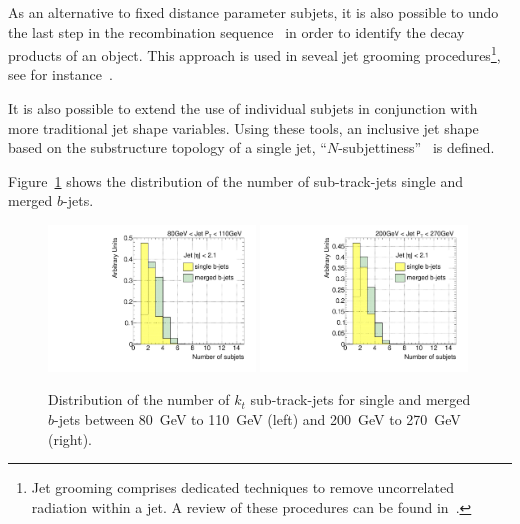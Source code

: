 As an alternative to fixed distance parameter subjets, it is also possible to undo the last step in the recombination sequence~\cite{kt2} in order to identify the decay products of an object.  This approach is used in seveal jet grooming procedures\footnote{Jet grooming comprises dedicated techniques to remove uncorrelated radiation within a jet. A review of these procedures can be found in~\cite{Abdesselam:2010pt}. }, see for instance~\cite{pruning}.


It is also possible to extend the use of individual subjets in conjunction with more traditional jet shape variables. Using these tools, an inclusive jet shape based on the substructure topology of a single jet, ``$N$-subjettiness''~\cite{nsubjettiness} is defined.


Figure~\ref{fig:nsubjetsinglemerged} shows the distribution of the number of sub-track-jets single and merged $b$-jets.
\\[3mm]

\begin{figure}[tp]
\centering
\includegraphics[width=0.49\textwidth]{FIGS/VarsSingleMerged/Nsubjets080.pdf}
\includegraphics[width=0.49\textwidth]{FIGS/VarsSingleMerged/Nsubjets200.pdf}
\caption{Distribution of the number of $k_t$ sub-track-jets for single and merged $b$-jets between 80~GeV to 110~GeV (left) and 200~GeV to 270~GeV (right).}
\label{fig:nsubjetsinglemerged}
\end{figure}


